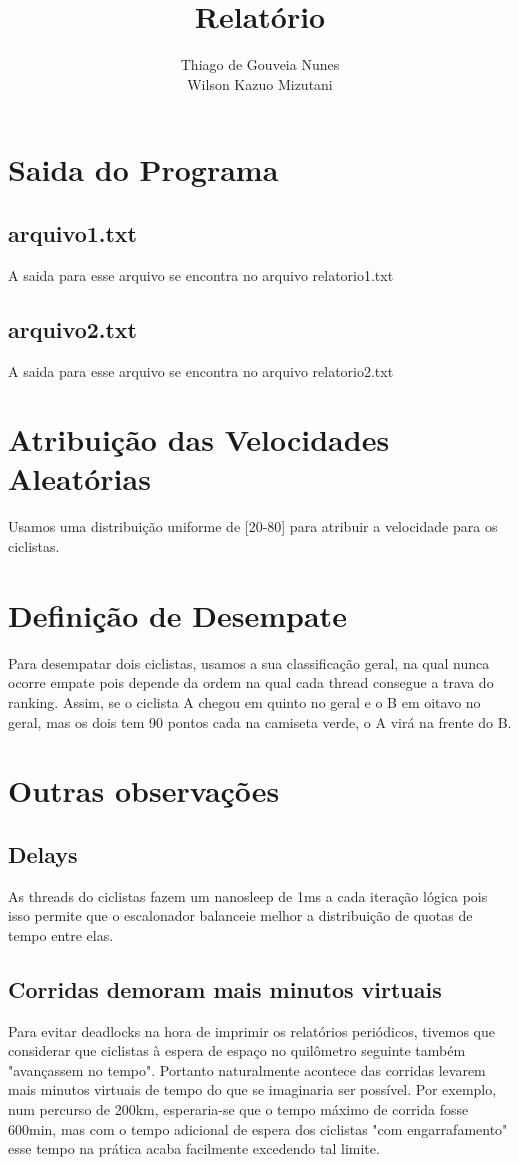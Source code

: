 \documentclass[a4paper,11pt]{article}
\title{Relatório}
\author{Thiago de Gouveia Nunes \\ Wilson Kazuo Mizutani}
\begin{document}
\maketitle
\tableofcontents

\clearpage
\section{Saida do Programa}
\subsection{arquivo1.txt}
  A saida para esse arquivo se encontra no arquivo relatorio1.txt
\subsection{arquivo2.txt}
  A saida para esse arquivo se encontra no arquivo relatorio2.txt
\section{Atribuição das Velocidades Aleatórias}
  Usamos uma distribuição uniforme de [20-80] para atribuir a velocidade para os ciclistas.
\section{Definição de Desempate}
  Para desempatar dois ciclistas, usamos a sua classificação geral, na qual nunca ocorre empate pois depende da ordem na qual cada thread
consegue a trava do ranking. Assim, se o ciclista A chegou em quinto no geral e o B em oitavo no geral, mas os dois tem 90 pontos
cada na camiseta verde, o A virá na frente do B.
\section{Outras observações}
\subsection{Delays}
  As threads do ciclistas fazem um nanosleep de 1ms a cada iteração lógica pois isso permite que o escalonador balanceie melhor a
distribuição de quotas de tempo entre elas.
\subsection{Corridas demoram mais minutos virtuais}
  Para evitar deadlocks na hora de imprimir os relatórios periódicos, tivemos que considerar que ciclistas à espera de espaço no
quilômetro seguinte também "avançassem no tempo". Portanto naturalmente acontece das corridas levarem mais minutos virtuais de tempo do
que se imaginaria ser possível. Por exemplo, num percurso de 200km, esperaria-se que o tempo máximo de corrida fosse 600min, mas com o
tempo adicional de espera dos ciclistas "com engarrafamento" esse tempo na prática acaba facilmente excedendo tal limite.
\end{document}
